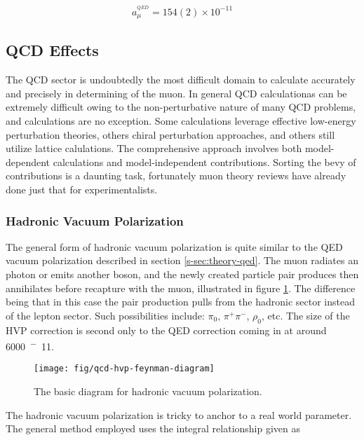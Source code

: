\begin{equation}
\label{eqn:ew-total}
a_\mu^{^{QED}} = 154(2) \times 10^{-11}
\end{equation}

\subsection{QCD Effects} \label{s-sec:theory-qcd}

The QCD sector is undoubtedly the most difficult domain to calculate accurately and precisely in determining \gmtwo of the muon.  In general QCD calculationas can be extremely difficult owing to the non-perturbative nature of many QCD problems, and \mugmtwo calculations are no exception.  Some calculations leverage effective low-energy perturbation theories, others chiral perturbation approaches, and others still utilize lattice calulations\cite{the-muon-g-2}.  The comprehensive approach involves both model-dependent calculations and model-independent contributions.  Sorting the bevy of contributions is a daunting task, fortunately muon \gmtwo theory reviews have already done just that for experimentalists.

\subsubsection{Hadronic Vacuum Polarization}

The general form of hadronic vacuum polarization is quite similar to the QED vacuum polarization described in section \ref{s-sec:theory-qed}.  The muon radiates an photon or emits another boson, and the newly created particle pair produces then annihilates before recapture with the muon, illustrated in figure \ref{fig:qcd-hvp-feynman-diagram}.  The difference being that in this case the pair production pulls from the hadronic sector instead of the lepton sector.  Such possibilities include: $\pi_0$, $\pi^+\pi^-$, $\rho_0$, etc.  The size of the HVP correction is second only to the QED correction coming in at around \SI{6000}{^-11}.  

\begin{figure}
\label{fig:qcd-hvp-feynman-diagram}
\centering
\texttt{[image: fig/qcd-hvp-feynman-diagram]}
\caption{The basic diagram for hadronic vacuum polarization.}
\end{figure}

The hadronic vacuum polarization is tricky to anchor to a real world parameter.  The general method employed uses the integral relationship given as

